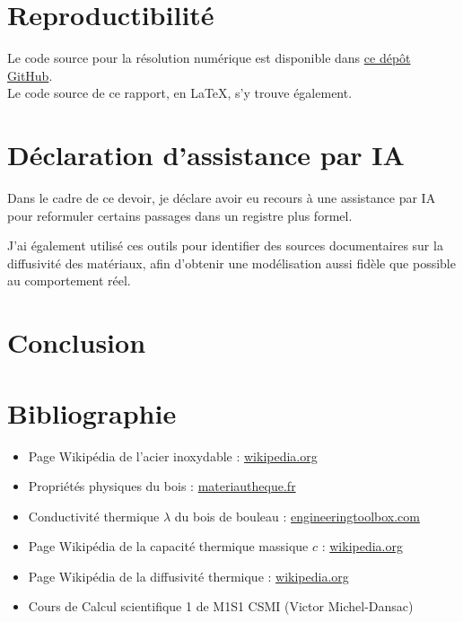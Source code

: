 \documentclass[11pt,a4paper]{article}
\begin{document}
\section{Reproductibilité}
Le code source pour la résolution numérique est disponible dans \href{https://github.com/pauline-wierzbicki/cs2-2026-dm-soupe}{ce dépôt GitHub}. \\
Le code source de ce rapport, en \LaTeX, s'y trouve également.

\section{Déclaration d'assistance par IA}
Dans le cadre de ce devoir, je déclare avoir eu recours à une assistance par IA
pour reformuler certains passages dans un registre plus formel.

J'ai également utilisé ces outils pour identifier des sources documentaires
sur la diffusivité des matériaux, afin d'obtenir une modélisation
aussi fidèle que possible au comportement réel.

\section{Conclusion}
\label{sec:conclusion}

\section{Bibliographie}
\label{sec:bibliographie}

\begin{itemize}
  \item Page Wikipédia de l'acier inoxydable : \href{https://fr.wikipedia.org/wiki/Acier_inoxydable}{wikipedia.org}
  \item Propriétés physiques du bois : \href{https://materiautheque.fr/materiaux/proprietes-du-bois/}{materiautheque.fr}
  \item Conductivité thermique $\lambda$ du bois de bouleau : \href{https://www.engineeringtoolbox.com/thermal-conductivity-d_429.html}{engineeringtoolbox.com}
  \item Page Wikipédia de la capacité thermique massique $c$ : \href{https://fr.wikipedia.org/wiki/Capacit%C3%A9_thermique_massique}{wikipedia.org}
  \item Page Wikipédia de la diffusivité thermique : \href{https://fr.wikipedia.org/wiki/Diffusivit%C3%A9_thermique}{wikipedia.org}
  \item Cours de Calcul scientifique 1 de M1S1 CSMI (Victor Michel-Dansac)
\end{itemize}
\end{document}
